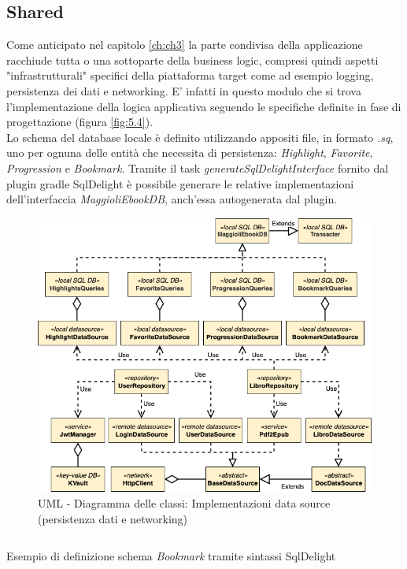 \subsection{Shared}
Come anticipato nel capitolo \ref{ch:ch3} la parte condivisa della applicazione racchiude tutta o una sottoparte della business logic, compresi quindi aspetti "infrastrutturali" specifici della piattaforma target come ad esempio logging, persistenza dei dati e networking. E' infatti in questo modulo che si trova l'implementazione della logica applicativa seguendo le specifiche definite in fase di progettazione (figura \ref{fig:5.4}).\\
Lo schema del database locale è definito utilizzando appositi file, in formato \textit{.sq}, uno per ognuna delle entità che necessita di persistenza: \textit{Highlight}, \textit{Favorite}, \textit{Progression} e \textit{Bookmark}. Tramite il task \textit{generateSqlDelightInterface} fornito dal plugin gradle SqlDelight è possibile generare le relative implementazioni dell'interfaccia \textit{MaggioliEbookDB}, anch'essa autogenerata dal plugin. 

\begin{figure}[H]
\centering
\includegraphics[width=1\textwidth]{img/tesi-26-shareduml.drawio.png}
\caption{UML - Diagramma delle classi: Implementazioni data source (persistenza dati e networking)}
\end{figure}

\begin{listing}[H]
\inputminted{sql}{code/5-sqldelight}
\caption{Esempio di definizione schema \textit{Bookmark} tramite sintassi SqlDelight}
\end{listing}

